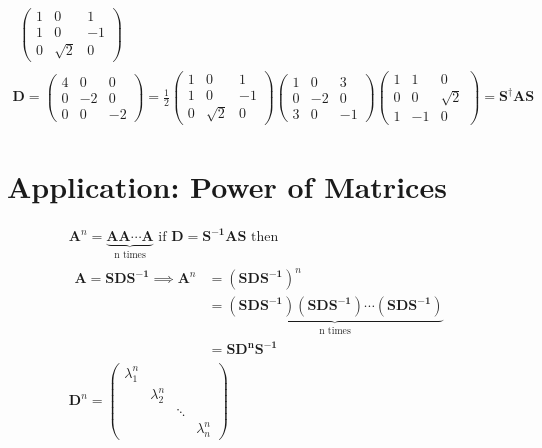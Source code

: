 \documentclass[a4paper, 11pt, normalem]{report}
\begin{document}
\begin{gather*}
\begin{aligned}
\begin{pmatrix}
            1 & 0 & 1 \\
            1 & 0 & -1 \\
            0 & \sqrt{2} & 0
        \end{pmatrix}
    \end{aligned} \\
    \mathbf{D} =
    \begin{pmatrix}
        4 & 0 & 0 \\
        0 & -2 & 0 \\
        0 & 0 & -2
    \end{pmatrix} = \frac{1}{2}
    \begin{pmatrix}
        1 & 0 & 1 \\
        1 & 0 & -1 \\
        0 & \sqrt{2} & 0
    \end{pmatrix}
    \begin{pmatrix}
        1 & 0 & 3 \\
        0 & -2 & 0 \\
        3 & 0 & -1
    \end{pmatrix}
    \begin{pmatrix}
        1 & 1 & 0 \\
        0 & 0 & \sqrt{2} \\
        1 & -1 & 0
    \end{pmatrix} = \mathbf{S^{\dagger}AS}
\end{gather*}

\section{Application: Power of Matrices}
\begin{gather*}
    \mathbf{A}^n = \underbrace{\mathbf{AA \cdots A}}_{\text{n times}} \text{ if } \mathbf{D} = \mathbf{S^{-1}AS} \text{ then } \\
    \begin{aligned}
        \mathbf{A} = \mathbf{SDS^{-1}} \implies \mathbf{A}^n &= (\mathbf{SDS^{-1}})^n \\
        &= \underbrace{(\mathbf{SDS^{-1}})(\mathbf{SDS^{-1}})\cdots(\mathbf{SDS^{-1}})}_{\text{n times}} \\
        &= \mathbf{SD^nS^{-1}}
    \end{aligned} \\
    \mathbf{D}^n =
    \begin{pmatrix}
        \lambda_{1}^n & & & \\
        & \lambda_{2}^n & & \\
        & & \ddots & \\
        & & & \lambda_{n}^n
    \end{pmatrix}
\end{gather*}
\end{document}
